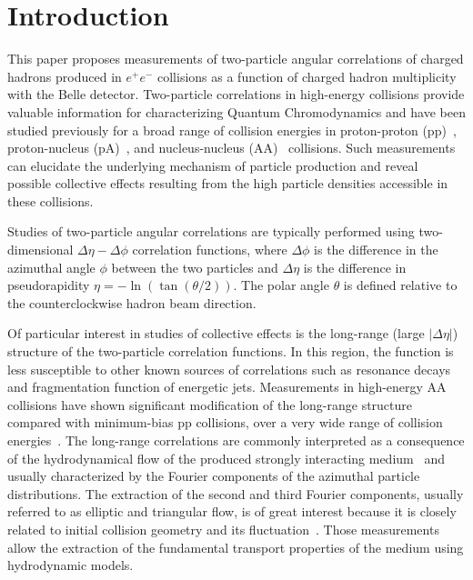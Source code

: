 \section{Introduction}

This paper proposes measurements of two-particle angular correlations of charged hadrons produced in $e^+e^-$ collisions as a function of charged hadron multiplicity with the Belle detector. Two-particle correlations in high-energy collisions provide valuable information for characterizing Quantum Chromodynamics and have been studied previously for a broad range of collision energies in proton-proton (pp)~\cite{Khachatryan:2010gv}, proton-nucleus (pA)~\cite{CMS:2012qk,Abelev:2012ola,Aad:2012gla}, and nucleus-nucleus (AA)~\cite{Aamodt:2010pa,Chatrchyan:2012wg} collisions. Such measurements can elucidate the underlying mechanism of particle production and reveal possible collective effects resulting from the high particle densities accessible in these collisions.

Studies of two-particle angular correlations are typically performed using two-dimensional $\Delta\eta-\Delta\phi$ correlation functions, where $\Delta\phi$ is the difference in the azimuthal angle $\phi$ between the two particles and $\Delta\eta$ is the difference in pseudorapidity $\eta = -\ln(\tan(\theta/2))$. The polar angle $\theta$ is defined relative to the counterclockwise hadron beam direction.

Of particular interest in studies of collective effects is the long-range (large $|\Delta\eta|$) structure of the two-particle correlation functions. In this region, the function is less susceptible to other known sources of correlations such as resonance decays and fragmentation function of energetic jets. Measurements in high-energy AA collisions have shown significant modification of the long-range structure compared with minimum-bias pp collisions, over a very wide range of collision energies~\cite{Back:2004je,Arsene:2004fa,Adcox:2004mh,Adams:2005dq}. The long-range correlations are commonly interpreted as a consequence of the hydrodynamical flow of the produced strongly interacting medium~\cite{Ollitrault:1992bk} and usually characterized by the Fourier components of the azimuthal particle distributions. The extraction of the second and third Fourier components, usually referred to as elliptic and triangular flow, is of great interest because it is closely related to initial collision geometry and its fluctuation~\cite{Alver:2010gr}. Those measurements allow the extraction of the fundamental transport properties of the medium using hydrodynamic models.


